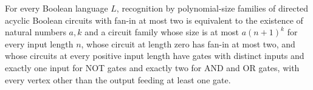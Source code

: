 \begin{theorem}
\label{Language.inPPoly_iff_inStrictPPoly}
\leanok
{}
For every Boolean language $L$, recognition by polynomial-size families of directed
acyclic Boolean circuits with fan-in at most two is equivalent to the existence of
natural numbers $a,k$ and a circuit family whose size is at most $a(n+1)^k$ for every
input length $n$, whose circuit at length zero has fan-in at most two, and whose
circuits at every positive input length have gates with distinct inputs and exactly one
input for NOT gates and exactly two for AND and OR gates, with every vertex other than
the output feeding at least one gate.
\end{theorem}
